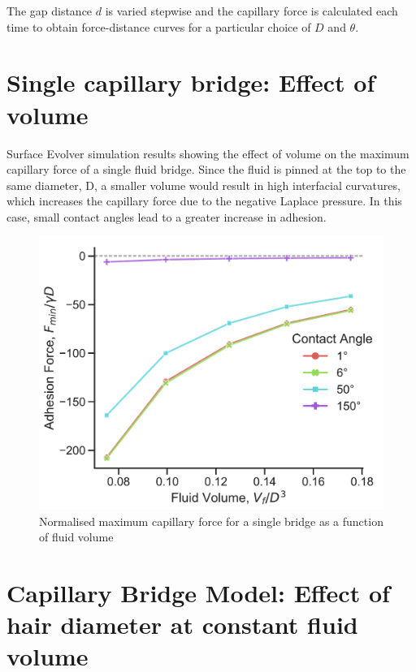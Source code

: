 \documentclass[english]{achemso}
\begin{document}
The gap distance $d$ is varied stepwise and the capillary force is
calculated each time to obtain force-distance curves for a particular
choice of $D$ and $\theta$. 

\section{Single capillary bridge: Effect of volume}

Surface Evolver simulation results showing the effect of volume on
the maximum capillary force of a single fluid bridge. Since the fluid
is pinned at the top to the same diameter, D, a smaller volume would
result in high interfacial curvatures, which increases the capillary
force due to the negative Laplace pressure. In this case, small contact
angles lead to a greater increase in adhesion.

\begin{figure}[H]

\begin{centering}
\includegraphics{FigureS2-Effect_of_fluid_volume}\caption{Normalised maximum capillary force for a single bridge as a function
of fluid volume}
\par\end{centering}
\end{figure}


\section{Capillary Bridge Model: Effect of hair diameter at constant fluid
volume}
\end{document}
